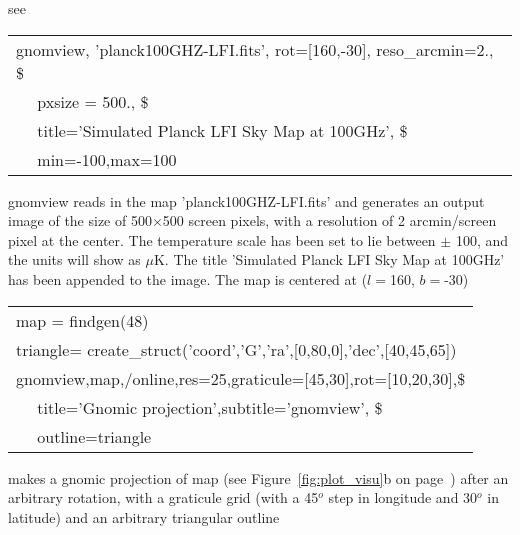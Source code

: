 %
\begin{related}
  \begin{sulist}{} %
  \item[{\ }] see 
  \end{sulist}
\end{related}

\begin{examples}{1}
{
\begin{tabular}{l} %
gnomview,  'planck100GHZ-LFI.fits', rot=[160,-30], reso\_arcmin=2., \$ \\
$\quad$           pxsize = 500., \$ \\
$\quad$           title='Simulated Planck LFI Sky Map at 100GHz',  \$ \\
$\quad$           min=-100,max=100\\
\end{tabular}
}
{gnomview reads in the map 'planck100GHZ-LFI.fits' and generates
an output image of the size of 500$\times$500 screen pixels, 
with a resolution of 2 arcmin/screen pixel at the center.
The temperature scale has been set to lie between $\pm$ 100, and the units will
show as $\mu$K.
The title 'Simulated Planck
LFI Sky Map at 100GHz' has been appended to the image. 
The map is centered at ($l=$160, $b=$-30) }
\end{examples}

\begin{examples}{2}
{
\begin{tabular}{l} %

map  = findgen(48) \\
triangle= create\_struct('coord','G','ra',[0,80,0],'dec',[40,45,65]) \\
gnomview,map,/online,res=25,graticule=[45,30],rot=[10,20,30],\$ \\
$\quad$	   title='Gnomic projection',subtitle='gnomview', \$ \\
$\quad$           outline=triangle \\
\end{tabular}
}
{makes a gnomic projection of map (see Figure~\ref{fig:plot_visu}b on
page~\pageref{page:plot_visu}) after an arbitrary rotation, with a graticule grid
(with a 45$^o$ step in longitude and 30$^o$ in latitude) and an arbitrary triangular outline}
\end{examples}
